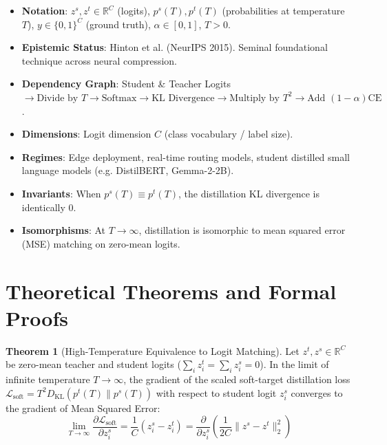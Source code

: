 \documentclass[11pt,a4paper]{article}
\theoremstyle{definition}
\newtheorem{theorem}{\textbf{Theorem}}[section]
\begin{document}
\begin{itemize}
    \item \textbf{Notation}: $z^s, z^t \in \mathbb{R}^C$ (logits), $p^s(T), p^t(T)$ (probabilities at temperature $T$), $y \in \{0, 1\}^C$ (ground truth), $\alpha \in [0, 1]$, $T > 0$.
    \item \textbf{Epistemic Status}: Hinton et al. (NeurIPS 2015). Seminal foundational technique across neural compression.
    \item \textbf{Dependency Graph}: Student \& Teacher Logits $\to \text{Divide by } T \to \text{Softmax} \to \text{KL Divergence} \to \text{Multiply by } T^2 \to \text{Add } (1-\alpha)\text{CE}$.
    \item \textbf{Dimensions}: Logit dimension $C$ (class vocabulary / label size).
    \item \textbf{Regimes}: Edge deployment, real-time routing models, student distilled small language models (e.g. DistilBERT, Gemma-2-2B).
    \item \textbf{Invariants}: When $p^s(T) \equiv p^t(T)$, the distillation KL divergence is identically $0$.
    \item \textbf{Isomorphisms}: At $T \to \infty$, distillation is isomorphic to mean squared error (MSE) matching on zero-mean logits.
\end{itemize}

\section{Theoretical Theorems and Formal Proofs}

\begin{theorem}[High-Temperature Equivalence to Logit Matching]
Let $z^t, z^s \in \mathbb{R}^C$ be zero-mean teacher and student logits ($\sum_i z_i^t = \sum_i z_i^s = 0$). In the limit of infinite temperature $T \to \infty$, the gradient of the scaled soft-target distillation loss $\mathcal{L}_{\text{soft}} = T^2 D_{\text{KL}}(p^t(T) \| p^s(T))$ with respect to student logit $z_i^s$ converges to the gradient of Mean Squared Error:
{\boldmath
\begin{equation}
\lim_{T \to \infty} \frac{\partial \mathcal{L}_{\text{soft}}}{\partial z_i^s} = \frac{1}{C} (z_i^s - z_i^t) = \frac{\partial}{\partial z_i^s} \left( \frac{1}{2C} \|z^s - z^t\|_2^2 \right)
\end{equation}
}
\end{theorem}
\end{document}
